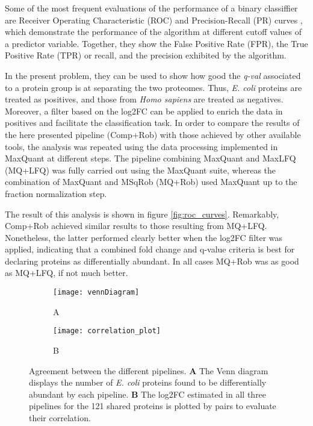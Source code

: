 Some of the most frequent evaluations of the performance of a binary classiffier are Receiver Operating Characteristic (ROC) and Precision-Recall (PR) curves \cite{Bradley1997}, which demonstrate the performance of the algorithm at different cutoff values of a predictor variable. Together, they show the False Positive Rate (FPR), the True Positive Rate (TPR) or recall, and the precision exhibited by the algorithm.




In the present problem, they can be used to show how good the \textit{q-val} associated to a protein group is at separating the two proteomes. Thus, \textit{E. coli} proteins are treated as positives, and those from \textit{Homo sapiens} are treated as negatives. Moreover, a filter based on the \ac{log2FC} can be applied to enrich the data in positives and facilitate the classification task.
In order to compare the results of the here presented pipeline (Comp+Rob) with those achieved by other available tools, the analysis was repeated using the data processing implemented in MaxQuant \cite{Cox2008} at different steps. The pipeline combining MaxQuant and MaxLFQ (MQ+LFQ) was fully carried out using the MaxQuant suite, whereas the combination of MaxQuant and MSqRob (MQ+Rob) used MaxQuant up to the fraction normalization step.

The result of this analysis is shown in figure \ref{fig:roc_curves}. Remarkably, Comp+Rob achieved similar results to those resulting from MQ+LFQ. Nonetheless, the latter performed clearly better when the \ac{log2FC} filter was applied, indicating that a combined fold change and q-value criteria is best for declaring proteins as differentially abundant. In all cases MQ+Rob was as good as MQ+LFQ, if not much better.


\begin{figure}[H]
\centering
\begin{subfigure}{.40\textwidth}
\caption*{A}
\texttt{[image: vennDiagram]}
\end{subfigure}
\begin{subfigure}{.52\textwidth}
\caption*{B}
\texttt{[image: correlation\_plot]}
\end{subfigure}
\caption{Agreement between the different pipelines. \textbf{A} The Venn diagram displays the number of \textit{E. coli} proteins found to be differentially abundant by each pipeline. \textbf{B} The log2FC estimated in all three pipelines for the 121 shared proteins is plotted by pairs to evaluate their correlation.}
\label{fig:venn_cor}
\end{figure}


